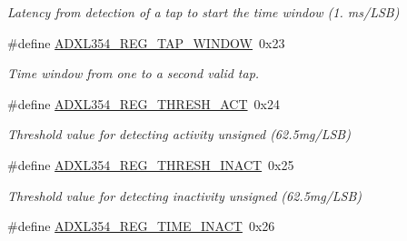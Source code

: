\begin{DoxyCompactItemize}
\begin{DoxyCompactList}\small\item\em \-Latency from detection of a tap to start the time window (1. ms/\-L\-S\-B) \end{DoxyCompactList}\item 
\hypertarget{group___a_d_x_l354___r_e_g_i_s_t_e_r_s_ga73a0d82a6a38bc427a9a3ead0621b04f}{\#define \hyperlink{group___a_d_x_l354___r_e_g_i_s_t_e_r_s_ga73a0d82a6a38bc427a9a3ead0621b04f}{\-A\-D\-X\-L354\-\_\-\-R\-E\-G\-\_\-\-T\-A\-P\-\_\-\-W\-I\-N\-D\-O\-W}~0x23}\label{group___a_d_x_l354___r_e_g_i_s_t_e_r_s_ga73a0d82a6a38bc427a9a3ead0621b04f}

\begin{DoxyCompactList}\small\item\em \-Time window from one to a second valid tap. \end{DoxyCompactList}\item 
\hypertarget{group___a_d_x_l354___r_e_g_i_s_t_e_r_s_ga704f29863fe15d8f9b303e4716e34cdd}{\#define \hyperlink{group___a_d_x_l354___r_e_g_i_s_t_e_r_s_ga704f29863fe15d8f9b303e4716e34cdd}{\-A\-D\-X\-L354\-\_\-\-R\-E\-G\-\_\-\-T\-H\-R\-E\-S\-H\-\_\-\-A\-C\-T}~0x24}\label{group___a_d_x_l354___r_e_g_i_s_t_e_r_s_ga704f29863fe15d8f9b303e4716e34cdd}

\begin{DoxyCompactList}\small\item\em \-Threshold value for detecting activity unsigned (62.\-5mg/\-L\-S\-B) \end{DoxyCompactList}\item 
\hypertarget{group___a_d_x_l354___r_e_g_i_s_t_e_r_s_ga54554f252e8b54180d35ff0425644c2f}{\#define \hyperlink{group___a_d_x_l354___r_e_g_i_s_t_e_r_s_ga54554f252e8b54180d35ff0425644c2f}{\-A\-D\-X\-L354\-\_\-\-R\-E\-G\-\_\-\-T\-H\-R\-E\-S\-H\-\_\-\-I\-N\-A\-C\-T}~0x25}\label{group___a_d_x_l354___r_e_g_i_s_t_e_r_s_ga54554f252e8b54180d35ff0425644c2f}

\begin{DoxyCompactList}\small\item\em \-Threshold value for detecting inactivity unsigned (62.\-5mg/\-L\-S\-B) \end{DoxyCompactList}\item 
\hypertarget{group___a_d_x_l354___r_e_g_i_s_t_e_r_s_ga4cc1633cd481ae135ce068783e69f98d}{\#define \hyperlink{group___a_d_x_l354___r_e_g_i_s_t_e_r_s_ga4cc1633cd481ae135ce068783e69f98d}{\-A\-D\-X\-L354\-\_\-\-R\-E\-G\-\_\-\-T\-I\-M\-E\-\_\-\-I\-N\-A\-C\-T}~0x26}\label{group___a_d_x_l354___r_e_g_i_s_t_e_r_s_ga4cc1633cd481ae135ce068783e69f98d}


\end{DoxyCompactItemize}
